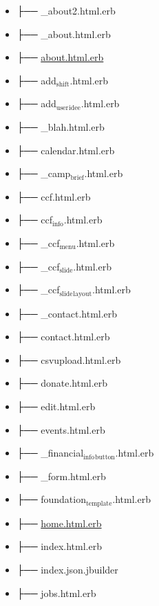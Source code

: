 \documentclass[11pt]{article}
\begin{document}
\begin{itemize}
\begin{itemize}
\item ├── \_about2.html.erb
\label{sec-1-1-9-8-1}
\item ├── \_about.html.erb
\label{sec-1-1-9-8-2}
\item ├── \href{./app/views/pages/about.html.erb}{about.html.erb}
\label{sec-1-1-9-8-3}
\item ├── add$_{\text{shift}}$.html.erb
\label{sec-1-1-9-8-4}
\item ├── add$_{\text{user}}$$_{\text{idee}}$.html.erb
\label{sec-1-1-9-8-5}
\item ├── \_blah.html.erb
\label{sec-1-1-9-8-6}
\item ├── calendar.html.erb
\label{sec-1-1-9-8-7}
\item ├── \_camp$_{\text{brief}}$.html.erb
\label{sec-1-1-9-8-8}
\item ├── ccf.html.erb
\label{sec-1-1-9-8-9}
\item ├── ccf$_{\text{info}}$.html.erb
\label{sec-1-1-9-8-10}
\item ├── \_ccf$_{\text{menu}}$.html.erb
\label{sec-1-1-9-8-11}
\item ├── \_ccf$_{\text{slide}}$.html.erb
\label{sec-1-1-9-8-12}
\item ├── \_ccf$_{\text{slide}}$$_{\text{layout}}$.html.erb
\label{sec-1-1-9-8-13}
\item ├── \_contact.html.erb
\label{sec-1-1-9-8-14}
\item ├── contact.html.erb
\label{sec-1-1-9-8-15}
\item ├── csvupload.html.erb
\label{sec-1-1-9-8-16}
\item ├── donate.html.erb
\label{sec-1-1-9-8-17}
\item ├── edit.html.erb
\label{sec-1-1-9-8-18}
\item ├── events.html.erb
\label{sec-1-1-9-8-19}
\item ├── \_financial$_{\text{info}}$$_{\text{button}}$.html.erb
\label{sec-1-1-9-8-20}
\item ├── \_form.html.erb
\label{sec-1-1-9-8-21}
\item ├── foundation$_{\text{template}}$.html.erb
\label{sec-1-1-9-8-22}
\item ├── \href{./app/views/pages/home.html.erb}{home.html.erb}
\label{sec-1-1-9-8-23}
\item ├── index.html.erb
\label{sec-1-1-9-8-24}
\item ├── index.json.jbuilder
\label{sec-1-1-9-8-25}
\item ├── jobs.html.erb
$$
\end{itemize}
\end{itemize}
\end{document}
